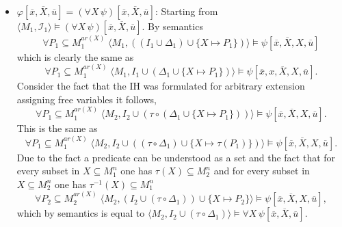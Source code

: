 \documentclass[11pt,a4paper]{article}
\begin{document}
\begin{itemize}[leftmargin=*]
\item  $\varphi[\overline{x}, \overline{X}, \overline{u}] = (\forall X \, \psi)[\overline{x}, \overline{X}, \overline{u}]$: Starting from $\langle M_1, \mathcal{I}_1 \rangle \models (\forall X \, \psi)[\overline{x}, \overline{X}, \overline{u}]$. By semantics  
\begin{equation*}
\forall P_1 \subseteq M_1^{ar(X)} \; \langle M_1 , ((I_1 \cup \Delta_1) \cup \{X \mapsto P_1\}) \rangle \models \psi[\overline{x}, \overline{X}, X, \overline{u}]
\end{equation*}
which is clearly the same as
\begin{equation*}
\forall P_1 \subseteq M_1^{ar(X)} \; \langle M_1 , I_1 \cup (\Delta_1 \cup \{X \mapsto P_1\}) \rangle \models \psi[\overline{x},x, \overline{X}, X, \overline{u}].
\end{equation*}
Consider the fact that the IH was formulated for arbitrary extension assigning free variables it follows,
 \begin{equation*}
\forall  P_1 \subseteq M_1^{ar(X)} \;  \langle M_2 , I_2 \cup (\tau \circ (\Delta_1 \cup \{X \mapsto P_1\})) \rangle \models \psi[\overline{x}, \overline{X},X, \overline{u}].
\end{equation*} 
This is the same as 
\begin{equation*}
\forall  P_1 \subseteq M_1^{ar(X)} \;  \langle M_2 , I_2 \cup ((\tau \circ \Delta_1) \cup \{X \mapsto \tau (P_1)\}) \rangle \models \psi[\overline{x}, \overline{X}, X, \overline{u}].
\end{equation*}
Due to the fact a predicate can be understood as a set and the fact that for every subset in $X \subseteq M_1^n$ one has $\tau(X) \subseteq M_2^n$ and for every subset in $X \subseteq M_2^n$ one has $\tau^{-1}(X) \subseteq M_1^n$ 
\begin{equation*}
\forall  P_2 \subseteq M_2^{ar(X)}\;  \langle M_2 , (I_2 \cup (\tau \circ \Delta_1)) \cup \{X \mapsto P_2 \} \rangle \models \psi[\overline{x}, \overline{X},X, \overline{u}],
\end{equation*}
which by semantics is equal to $\langle M_2 , I_2 \cup (\tau \circ \Delta_1)\rangle \models \forall X \, \psi[\overline{x}, \overline{X}, \overline{u}]$. \\





\end{itemize}
\end{document}
